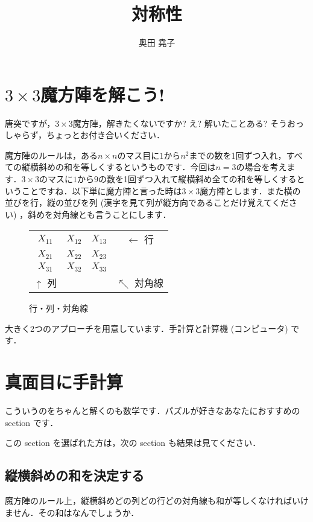 \documentclass[11pt]{jsarticle}
\title{対称性}
\author{奥田 堯子}
\begin{document}
\maketitle
\section{$3\times 3$魔方陣を解こう!}
唐突ですが，$3\times 3$魔方陣，解きたくないですか? え? 解いたことある? そうおっしゃらず，ちょっとお付き合いください．

魔方陣のルールは，ある$n\times n$のマス目に$1$から$n^2$までの数を1回ずつ入れ，すべての縦横斜めの和を等しくするというものです．今回は$n=3$の場合を考えます．$3\times 3$のマスに$1$から$9$の数を1回ずつ入れて縦横斜め全ての和を等しくするということですね．以下単に魔方陣と言った時は$3\times 3$魔方陣とします．また横の並びを行，縦の並びを列 (漢字を見て列が縦方向であることだけ覚えてください) ，斜めを対角線とも言うことにします．

\begin{figure}[H]
  \centering
  \begin{tabular}{|c|c|c|c}
    \cline{1-3}
    $X_{11}$ & $X_{12}$ & $X_{13}$ & $\leftarrow$ 行 \\
    \cline{1-3} 
    $X_{21}$ & $X_{22}$ & $X_{23}$ \\ \cline{1-3}
    $X_{31}$ & $X_{32}$ & $X_{33}$ \\ \cline{1-3}
    \multicolumn{1}{c}{$\uparrow$ 列}& \multicolumn{1}{c}{} & \multicolumn{1}{c}{}& \multicolumn{1}{c}{$\nwarrow$ 対角線}\\
  \end{tabular}
  \caption{行・列・対角線}
  \label{magic}
\end{figure}

大きく2つのアプローチを用意しています．手計算と計算機 (コンピュータ) です．

\section{真面目に手計算}
こういうのをちゃんと解くのも数学です．パズルが好きなあなたにおすすめの section です．

この section を選ばれた方は，次の section も結果は見てください．

\subsection{縦横斜めの和を決定する}
魔方陣のルール上，縦横斜めどの列どの行どの対角線も和が等しくなければいけません．その和はなんでしょうか．
\end{document}

